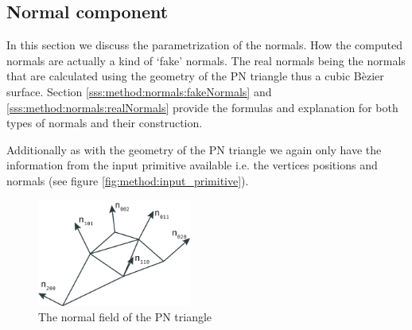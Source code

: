 
\subsection{Normal component}\label{ss:normal_component}
In this section we discuss the parametrization of the normals. How the computed normals are actually a kind of `fake' normals. The real normals being the normals that are calculated using the geometry of the PN triangle thus a cubic B\`ezier surface. Section \ref{sss:method:normals:fakeNormals} and \ref{sss:method:normals:realNormals} provide the formulas and explanation for both types of normals and their construction. 

Additionally as with the geometry of the PN triangle we again only have the information from the input primitive available i.e. the vertices positions and normals (see figure \ref{fig:method:input_primitive}).

\begin{figure}
	\centering
	\includegraphics[width=0.45\textwidth]{./content/img/method/normals.png}
	\caption{The normal field of the PN triangle}
	\label{fig:method:normal_field}
\end{figure}

